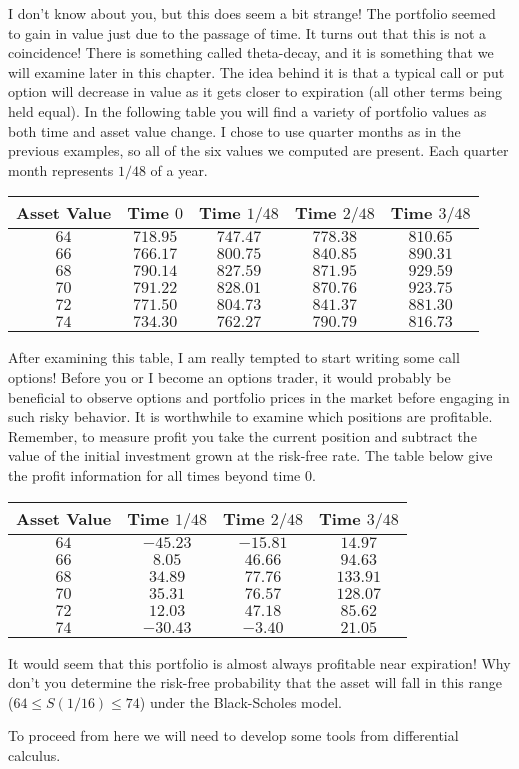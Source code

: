 \documentclass{ximera}
\begin{document}
I don't know about you, but this does seem a bit strange! The portfolio seemed to gain in value just due to the passage of time. It turns out that this is not a coincidence! There is something called theta-decay, and it is something that we will examine later in this chapter. The idea behind it is that a typical call or put option will decrease in value as it gets closer to expiration (all other terms being held equal). In the following table you will find a variety of portfolio values as both time and asset value change. I chose to use quarter months as in the previous examples, so all of the six values we computed are present. Each quarter month represents $1/48$ of a year. 

\begin{center}
	\begin{tabular}{c|cccc}
	Asset Value 	& Time $0$ 	& Time $1/48$ 	& Time $2/48$ 	& Time $3/48$\\
	\hline
	$64$		& $718.95$	& $747.47$		& $778.38$		& $810.65$\\
	$66$		& $766.17$	& $800.75$		& $840.85$		& $890.31$\\
	$68$		& $790.14$	& $827.59$		& $871.95$		& $929.59$\\
	$70$		& $791.22$	& $828.01$		& $870.76$		& $923.75$\\
	$72$		& $771.50$	& $804.73$		& $841.37$		& $881.30$\\
	$74$		& $734.30$	& $762.27$		& $790.79$		& $816.73$
	\end{tabular}
\end{center}

After examining this table, I am really tempted to start writing some call options! Before you or I become an options trader, it would probably be beneficial to observe options and portfolio prices in the market before engaging in such risky behavior. It is worthwhile to examine which positions are profitable. Remember, to measure profit you take the current position and subtract the value of the initial investment grown at the risk-free rate. The table below give the profit information for all times beyond time 0.

\begin{center}
	\begin{tabular}{c|ccc}
	Asset Value 	& Time $1/48$ 	& Time $2/48$ 	& Time $3/48$\\
	\hline
	$64$		& $-45.23$		& $-15.81$		& $14.97$\\
	$66$		& $8.05$		& $46.66$		& $94.63$\\
	$68$		& $34.89$		& $77.76$		& $133.91$\\
	$70$		& $35.31$		& $76.57$		& $128.07$\\
	$72$		& $12.03$		& $47.18$		& $85.62$\\
	$74$		& $-30.43$		& $-3.40$		& $21.05$
	\end{tabular}
\end{center}

It would seem that this portfolio is almost always profitable near expiration! Why don't you determine the risk-free probability that the asset will fall in this range ($64\leq S(1/16)\leq 74$) under the Black-Scholes model.

To proceed from here we will need to develop some tools from differential calculus.
\end{document}

